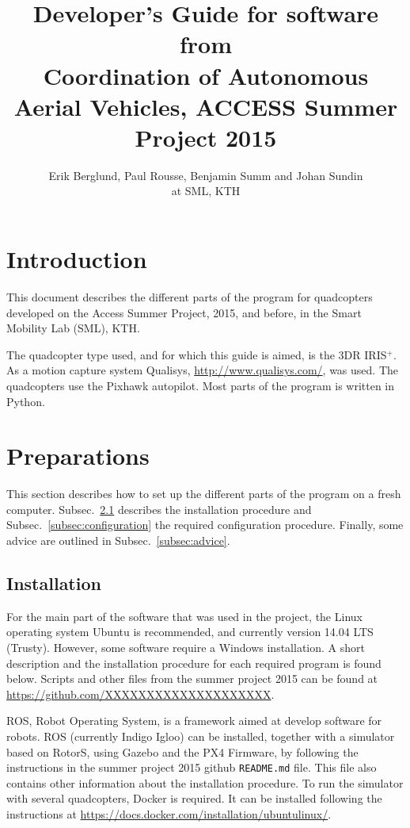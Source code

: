 \documentclass[titlepage,11pt,a4paper]{article}
\title{Developer's Guide for software from \\Coordination of Autonomous Aerial Vehicles, ACCESS Summer Project 2015}
\author{Erik Berglund, Paul Rousse, Benjamin
  Summ and Johan Sundin \\at SML, KTH}
\begin{document}
\maketitle \tableofcontents
\newpage

\section{Introduction}
This document describes the different parts of the program for
quadcopters developed on the Access Summer Project, 2015, and before,
in the Smart Mobility Lab (SML), KTH.

The quadcopter type used, and for which this guide is aimed, is the
3DR IRIS$^+$. As a motion capture system Qualisys,
\url{http://www.qualisys.com/}, was used. The quadcopters use the
Pixhawk autopilot. Most parts of the program is written in Python.


\section{Preparations}
This section describes how to set up the different parts of the
program on a fresh computer. Subsec.~\ref{subsec:installation}
describes the installation procedure and
Subsec.~\ref{subsec:configuration} the required configuration
procedure. Finally, some advice are outlined in
Subsec.~\ref{subsec:advice}.

\subsection{Installation}
\label{subsec:installation}
For the main part of the software that was used in the project, the
Linux operating system Ubuntu is recommended, and currently version
14.04 LTS (Trusty). However, some software require a Windows
installation. A short description and the installation procedure for
each required program is found below. Scripts and other files from the
summer project 2015 can be found at
\url{https://github.com/XXXXXXXXXXXXXXXXXXXX}.

ROS, Robot Operating System, is a framework aimed at develop software
for robots. ROS (currently Indigo Igloo) can be installed, together
with a simulator based on RotorS, using Gazebo and the PX4 Firmware,
by following the instructions in the summer project 2015 github
\texttt{README.md} file. This file also contains other information
about the installation procedure. To run the simulator with several
quadcopters, Docker is required. It can be installed following the
instructions at
\url{https://docs.docker.com/installation/ubuntulinux/}.
\end{document}
